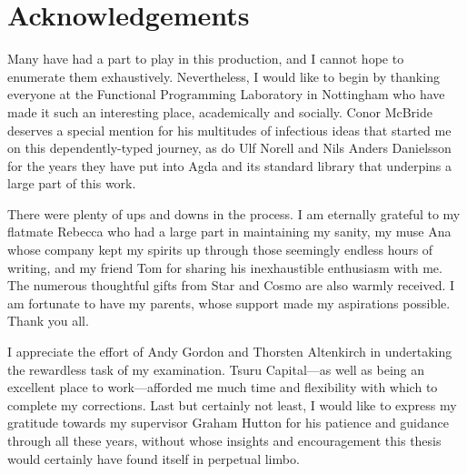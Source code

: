 \documentclass[12pt,twoside,openright]{book}
\begin{document}

\chapter*{Acknowledgements}

Many have had a part to play in this production, and I cannot hope to
enumerate them exhaustively. Nevertheless, I would like to begin by thanking
everyone at the Functional Programming Laboratory in Nottingham who have
made it such an interesting place, academically and socially. Conor McBride
deserves a special mention for his multitudes of infectious ideas that
started me on this dependently-typed journey, as do Ulf Norell and Nils
Anders Danielsson for the years they have put into Agda and its standard
library that underpins a large part of this work.

There were plenty of ups and downs in the process. I am eternally grateful
to my flatmate Rebecca who had a large part in maintaining my sanity, my
muse Ana whose company kept my spirits up through those seemingly endless
hours of writing, and my friend Tom for sharing his inexhaustible enthusiasm
with me. The numerous thoughtful gifts from Star and Cosmo are also warmly
received. I am fortunate to have my parents, whose support made my
aspirations possible. Thank you all.

I appreciate the effort of Andy Gordon and Thorsten Altenkirch in
undertaking the rewardless task of my examination. Tsuru Capital---as well
as being an excellent place to work---afforded me much time and flexibility
with which to complete my corrections. Last but certainly not least, I would
like to express my gratitude towards my supervisor Graham Hutton for his
patience and guidance through all these years, without whose insights and
encouragement this thesis would certainly have found itself in perpetual
limbo.

\tableofcontents

{}
{}
{}
{}
{}
{}
{}
{}
{}
{}



\end{document}
